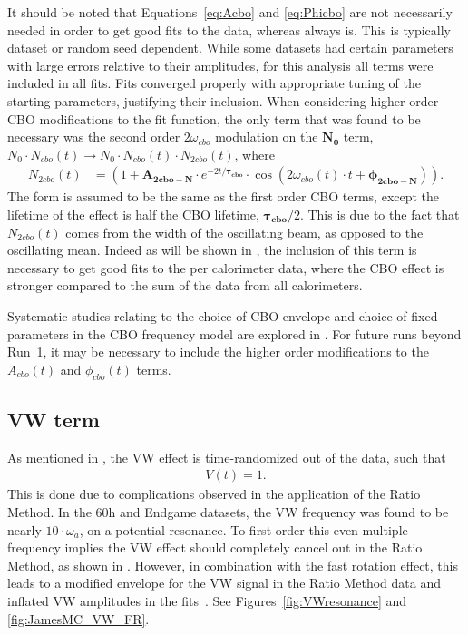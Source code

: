 It should be noted that Equations~\ref{eq:Acbo} and \ref{eq:Phicbo} are not necessarily needed in order to get good fits to the data, whereas  always is. This is typically dataset or random seed dependent. While some datasets had certain parameters with large errors relative to their amplitudes, for this analysis all terms were included in all fits. Fits converged properly with appropriate tuning of the starting parameters, justifying their inclusion. When considering higher order CBO modifications to the fit function, the only term that was found to be necessary was the second order $2\omega_{cbo}$ modulation on the $\boldsymbol{N_{0}}$ term, $N_{0} \cdot N_{cbo}(t) \rightarrow N_{0} \cdot N_{cbo}(t) \cdot  N_{2cbo}(t)$, where
    \begin{align}
        N_{2cbo}(t) &= (1 + \boldsymbol{A_{2cbo-N}} \cdot e^{-2t/\boldsymbol{\tau_{cbo}}} \cdot \cos(2\omega_{cbo}(t) \cdot t + \boldsymbol{\phi_{2cbo-N}})). \label{eq:N2cbo}
    \end{align}
The form is assumed to be the same as the first order CBO terms, except the lifetime of the effect is half the CBO lifetime, $\boldsymbol{\tau_{cbo}}/2$. This is due to the fact that $N_{2cbo}(t)$ comes from the width of the oscillating beam, as opposed to the oscillating mean. Indeed as will be shown in , the inclusion of this term is necessary to get good fits to the per calorimeter data, where the CBO effect is stronger compared to the sum of the data from all calorimeters. 




Systematic studies relating to the choice of CBO envelope and choice of fixed parameters in the CBO frequency model are explored in . For future runs beyond Run~1, it may be necessary to include the higher order modifications to the $A_{cbo}(t)$ and $\phi_{cbo}(t)$ terms.



\subsection{VW term}
\label{sub:vw_term}

As mentioned in , the VW effect is time-randomized out of the data, such that 
    \begin{align}
        V(t) = 1. 
    \end{align}
This is done due to complications observed in the application of the Ratio Method. In the 60h and Endgame datasets, the VW frequency was found to be nearly $10 \cdot \omega_{a}$, on a potential resonance. To first order this even multiple frequency implies the VW effect should completely cancel out in the Ratio Method, as shown in . However, in combination with the fast rotation effect, this leads to a modified envelope for the VW signal in the Ratio Method data and inflated VW amplitudes in the fits~\cite{VWinRatio}. See Figures~\ref{fig:VWresonance} and \ref{fig:JamesMC_VW_FR}.

